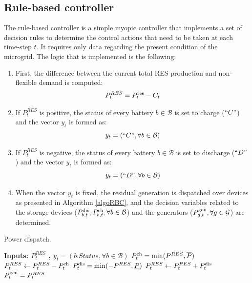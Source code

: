 \documentclass{article}
\begin{document}
\subsection{Rule-based controller}
The rule-based controller is a simple myopic controller that implements a set of decision rules to determine the control actions that need to be taken at each time-step $t$. It requires only data regarding the present condition of the microgrid. The logic that is implemented is the following:
\begin{enumerate}
	\item First, the difference between the current total RES production and non-flexible demand is computed: $$P_t^{RES} = P^\text{res}_t - C_{t}$$
	\item If $P_t^{RES}$ is positive, the status of every battery $b \in \mathcal{B}$ is set to charge ($``C"$) and the vector $y_t$ is formed as:
		$$y_t = (``C", \forall b \in \mathcal{B})$$
	\item If $P_t^{RES}$ is negative, the status of every battery $b \in \mathcal{B}$ is set to discharge ($``D"$) and the vector $y_t$ is formed as:
	$$y_t = (``D", \forall b \in \mathcal{B})$$
	\item When the vector $y_t$ is fixed, the residual generation is dispatched over devices as presented in Algorithm \ref{algoRBC}, and the decision variables related to the storage devices ($P^{\text{dis}}_{b,t},P^{\text{ch}}_{b,t}, \forall b \in \mathcal{B}$) and the generators ($P^\text{gen}_{g,t}, \forall g \in \mathcal{G}$) are determined. 
\end{enumerate}

\begin{algorithm}[t]
	\caption{Power dispatch.}
	\begin{algorithmic}[1]
		\STATE \textbf{Inputs: $P_t^{RES}$ , $y_t = (b.Status, \forall b \in \mathcal{B})$}
		\STATE $P^{\text{ch}}_t = \min(P^{RES},\overline{P})$ 
		\ENDIF
		\STATE $P_t^{RES} \leftarrow P_t^{RES} - P^{\text{ch}}_t$
		\ENDFOR
		\ELSE
		\STATE $P^{\text{dis}}_t = \min(-P^{RES},\underline{P})$ 
		\ENDIF
		\STATE $P_t^{RES} \leftarrow P_t^{RES} +P^{\text{dis}}_t$
		\STATE $P^\text{gen}_t=P_t^{RES}$
		\ENDIF
		\ENDFOR
		\ENDIF
	\end{algorithmic}
	\label{algoRBC}
\end{algorithm}
\end{document}
